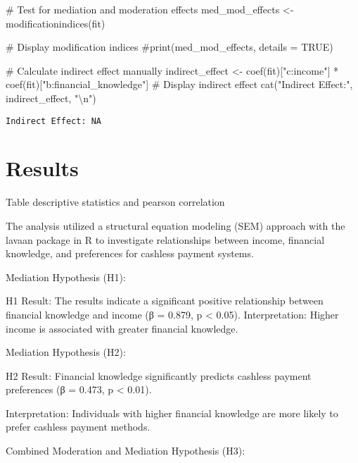 \documentclass[
  super,
  preprint,
  3p]{elsarticle}
\newenvironment{Shaded}{\begin{snugshade}}{\end{snugshade}}
\newcommand{\CommentTok}[1]{\textcolor[rgb]{0.37,0.37,0.37}{#1}}
\newcommand{\FunctionTok}[1]{\textcolor[rgb]{0.28,0.35,0.67}{#1}}
\newcommand{\NormalTok}[1]{\textcolor[rgb]{0.00,0.23,0.31}{#1}}
\newcommand{\OtherTok}[1]{\textcolor[rgb]{0.00,0.23,0.31}{#1}}
\newcommand{\SpecialCharTok}[1]{\textcolor[rgb]{0.37,0.37,0.37}{#1}}
\newcommand{\StringTok}[1]{\textcolor[rgb]{0.13,0.47,0.30}{#1}}
\begin{document}
\begin{Shaded}
\begin{Highlighting}[]
\CommentTok{\# Test for mediation and moderation effects}
\NormalTok{med\_mod\_effects }\OtherTok{\textless{}{-}} \FunctionTok{modificationindices}\NormalTok{(fit)}

\CommentTok{\# Display modification indices}
\CommentTok{\#print(med\_mod\_effects, details = TRUE)}

\CommentTok{\# Calculate indirect effect manually}
\NormalTok{indirect\_effect }\OtherTok{\textless{}{-}} \FunctionTok{coef}\NormalTok{(fit)[}\StringTok{"c:income"}\NormalTok{] }\SpecialCharTok{*} \FunctionTok{coef}\NormalTok{(fit)[}\StringTok{"b:financial\_knowledge"}\NormalTok{]}
\CommentTok{\# Display indirect effect}
\FunctionTok{cat}\NormalTok{(}\StringTok{"Indirect Effect:"}\NormalTok{, indirect\_effect, }\StringTok{"}\SpecialCharTok{\textbackslash{}n}\StringTok{"}\NormalTok{)}
\end{Highlighting}
\end{Shaded}

\begin{verbatim}
Indirect Effect: NA 
\end{verbatim}

\hypertarget{results}{%
\section{Results}\label{results}}

Table descriptive statistics and pearson correlation

The analysis utilized a structural equation modeling (SEM) approach with
the lavaan package in R to investigate relationships between income,
financial knowledge, and preferences for cashless payment systems.

Mediation Hypothesis (H1):

H1 Result: The results indicate a significant positive relationship
between financial knowledge and income (β = 0.879, p \textless{} 0.05).
Interpretation: Higher income is associated with greater financial
knowledge.

Mediation Hypothesis (H2):

H2 Result: Financial knowledge significantly predicts cashless payment
preferences (β = 0.473, p \textless{} 0.01).

Interpretation: Individuals with higher financial knowledge are more
likely to prefer cashless payment methods.

Combined Moderation and Mediation Hypothesis (H3):
\end{document}
